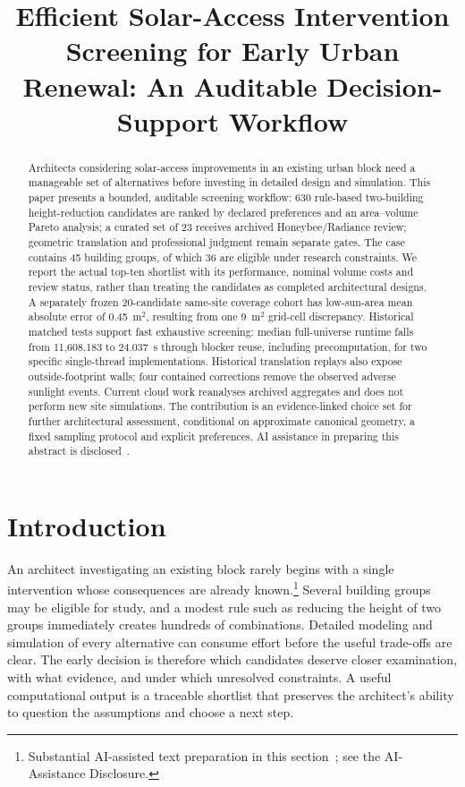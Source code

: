 \documentclass{llncs}
\newcommand{\aidraft}{\footnote{Substantial AI-assisted text preparation in this section~\cite{openai2026}; see the AI-Assistance Disclosure.}}
\begin{document}
\title{Efficient Solar-Access Intervention Screening for Early Urban Renewal: An Auditable Decision-Support Workflow}
\author{}
\institute{}
\maketitle
\begin{abstract}
Architects considering solar-access improvements in an existing urban block need a manageable set of alternatives before investing in detailed design and simulation. This paper presents a bounded, auditable screening workflow: 630 rule-based two-building height-reduction candidates are ranked by declared preferences and an area--volume Pareto analysis; a curated set of 23 receives archived Honeybee/Radiance review; geometric translation and professional judgment remain separate gates. The case contains 45 building groups, of which 36 are eligible under research constraints. We report the actual top-ten shortlist with its performance, nominal volume costs and review status, rather than treating the candidates as completed architectural designs. A separately frozen 20-candidate same-site coverage cohort has low-sun-area mean absolute error of 0.45~m$^2$, resulting from one 9~m$^2$ grid-cell discrepancy. Historical matched tests support fast exhaustive screening: median full-universe runtime falls from 11,608.183 to 24.037~s through blocker reuse, including precomputation, for two specific single-thread implementations. Historical translation replays also expose outside-footprint walls; four contained corrections remove the observed adverse sunlight events. Current cloud work reanalyses archived aggregates and does not perform new site simulations. The contribution is an evidence-linked choice set for further architectural assessment, conditional on approximate canonical geometry, a fixed sampling protocol and explicit preferences. AI assistance in preparing this abstract is disclosed~\cite{openai2026}.
\end{abstract}

\section{Introduction}
An architect investigating an existing block rarely begins with a single intervention whose consequences are already known.\aidraft{} Several building groups may be eligible for study, and a modest rule such as reducing the height of two groups immediately creates hundreds of combinations. Detailed modeling and simulation of every alternative can consume effort before the useful trade-offs are clear. The early decision is therefore which candidates deserve closer examination, with what evidence, and under which unresolved constraints. A useful computational output is a traceable shortlist that preserves the architect's ability to question the assumptions and choose a next step.
\end{document}
